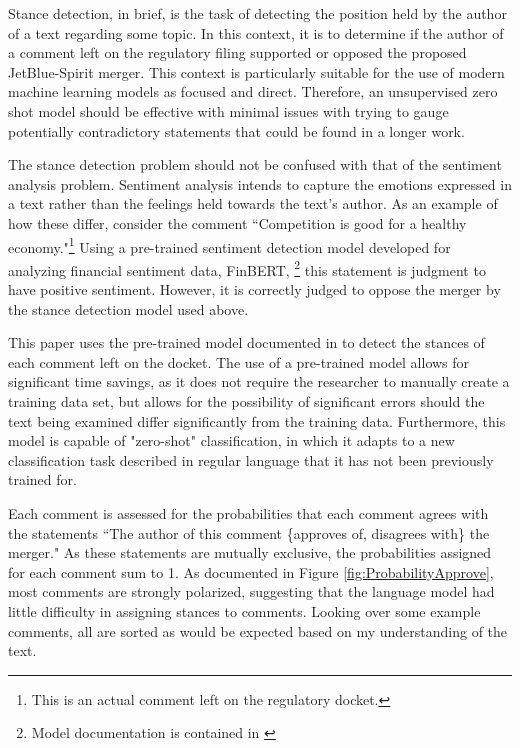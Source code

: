 \documentclass{article}
\begin{document}
\begin{appendices}
Stance detection, in brief, is the task of detecting the position held by the author of a text regarding some topic. In this context, it is to determine if the author of a comment left on the regulatory filing supported or opposed the proposed JetBlue-Spirit merger. This context is particularly suitable for the use of modern machine learning models as focused and direct. Therefore, an unsupervised zero shot model should be effective with minimal issues with trying to gauge potentially contradictory statements that could be found in a longer work. 

The stance detection problem should not be confused with that of the sentiment analysis problem. Sentiment analysis intends to capture the emotions expressed in a text rather than the feelings held towards the text's author. As an example of how these differ, consider the comment ``Competition is good for a healthy economy."\footnote{This is an actual comment left on the regulatory docket.} Using a pre-trained sentiment detection model developed for analyzing financial sentiment data, FinBERT, \footnote{Model documentation is contained in \citet{araci_finbert_2019}} this statement is judgment to have positive sentiment. However, it is correctly judged to oppose the merger by the stance detection model used above. 

This paper uses the pre-trained model documented in \citet{laurer_less_2024} to detect the stances of each comment left on the docket. The use of a pre-trained model allows for significant time savings, as it does not require the researcher to manually create a training data set, but allows for the possibility of significant errors should the text being examined differ significantly from the training data. Furthermore, this model is capable of "zero-shot" classification, in which it adapts to a new classification task described in regular language that it has not been previously trained for. 

Each comment is assessed for the probabilities that each comment agrees with the statements ``The author of this comment \{approves of, disagrees with\} the merger." As these statements are mutually exclusive, the probabilities assigned for each comment sum to 1. As documented in Figure \ref{fig:ProbabilityApprove}, most comments are strongly polarized, suggesting that the language model had little difficulty in assigning stances to comments. Looking over some example comments, all are sorted as would be expected based on my understanding of the text. 


\end{appendices}
\end{document}
